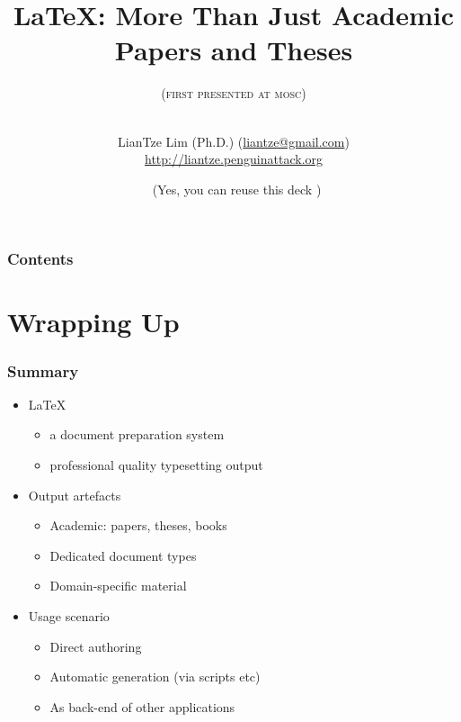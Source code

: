 \documentclass[xcolor={x11names,svgnames,dvipsnames},trans]{beamer}
\author[LianTze Lim (Ph.D.)]{\texorpdfstring{LianTze Lim (Ph.D.)
(\url{liantze@gmail.com})\\\url{http://liantze.penguinattack.org}}{LianTze Lim (Ph.D.)}}
\title{\LaTeX: More Than Just Academic Papers and Theses}
\subtitle{\texorpdfstring{(\textsc{first presented at mosc}\oldstylenums{2011})\\%
\hrulefill\ \adforn{57}\thickspace\wb{m}\thickspace\adforn{29}\ \hrulefill}{First Presented at MOSC 2011; some modifications since}}
\date[\ccbyncsa]{\ccbyncsa\ (Yes, you can reuse this deck \Smiley)}
\begin{document}
\begin{frame}[plain]
\maketitle
\end{frame}

\begin{frame}
\frametitle{Contents}
\tableofcontents
\end{frame}






\section{Wrapping Up}

\begin{frame}
\frametitle{Summary}
\begin{itemize}
\item<+-> \LaTeX
    \begin {itemize}
    \item a document preparation system
    \item professional quality typesetting output
    \end{itemize}
\item<+-> Output artefacts
    \begin{itemize}
    \item Academic: papers, theses, books
    \item Dedicated document types
    \item Domain-specific material
    \end{itemize}
\item<+-> Usage scenario
    \begin{itemize}
    \item Direct authoring
    \item Automatic generation (via scripts etc)
    \item As back-end of other applications
    \end{itemize}
\end{itemize}
\end{frame}
\end{document}
